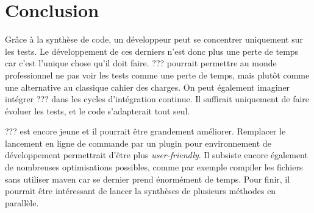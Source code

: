 \chapter*{Conclusion}
	\thispagestyle{conclusion}
	
\par Grâce à la synthèse de code, un développeur peut se concentrer uniquement sur les tests. Le développement de ces derniers n'est donc plus une perte de temps car c'est l'unique chose qu'il doit faire. ??? pourrait permettre au monde professionnel ne pas voir les tests comme une perte de temps, mais plutôt comme une alternative au classique cahier des charges. On peut également imaginer intégrer ??? dans les cycles d'intégration continue. Il suffirait uniquement de faire évoluer les tests, et le code s'adapterait tout seul.

\par ??? est encore jeune et il pourrait être grandement améliorer. Remplacer le lancement en ligne de commande par un plugin pour environnement de développement permettrait d'être plus \textit{user-friendly}. Il subsiste encore également de nombreuses optimisations possibles, comme par exemple compiler les fichiers sans utiliser maven car se dernier prend énormément de temps. Pour finir, il pourrait être intéressant de lancer la synthèses de plusieurs méthodes en parallèle.


\begin{center}
\end{center}
	
	

